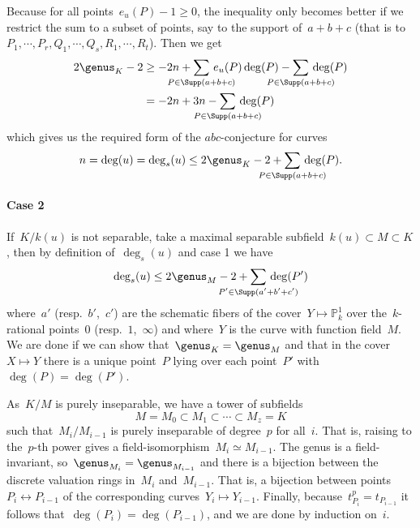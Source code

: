 Because for all points~$e_u(P)-1 \geq 0$, the inequality only becomes better if we restrict the sum to a subset of points, say to the support of~$a+b+c$ (that is to~$P_1,\cdots,P_r,Q_1,\cdots,Q_s,R_1,\cdots,R_t$). Then we get
\begin{equation}
  \begin{aligned}
    2 \genus_K -2 &\geq -2n + \sum_{\mathclap{P \in \Supp(a+b+c)}}\, e_u(P)\deg(P) - \sum_{\mathclap{P \in \Supp(a+b+c)}}\,\deg(P) \\
    &= -2n+3n-\sum_{\mathclap{P \in \Supp(a+b+c)}}\, \deg(P)
  \end{aligned}
\end{equation}
which gives us the required form of the $abc$-conjecture for curves
\begin{equation}
  n=\deg(u)=\deg_s(u) \leq 2\genus_K - 2 + \sum_{\mathclap{P \in \Supp(a+b+c)}}\, \deg(P).
\end{equation}

\paragraph{Case 2} If~$K/k(u)$ is not separable, take a maximal separable subfield~$k(u) \subset M \subset K$, then by definition of~$\deg_s(u)$ and case 1 we have
\begin{equation}
  \deg_s(u) \leq 2\genus_M - 2 + \sum_{\mathclap{P' \in \Supp(a'+b'+c')}}\, \deg(P')
\end{equation}
where~$a'$ (resp.~$b'$,~$c'$) are the schematic fibers of the cover~$Y \mapsto \mathbb{P}^1_k$ over the~$k$-rational points~$0$ (resp.~$1$,~$\infty$) and where~$Y$ is the curve with function field~$M$. We are done if we can show that~$\genus_K=\genus_M$ and that in the cover~$X \mapsto Y$ there is a unique point~$P$ lying over each point~$P'$ with~$\deg(P)=\deg(P')$.

As~$K/M$ is purely inseparable, we have a tower of subfields 
\begin{equation}
  M=M_0 \subset M_1 \subset \cdots \subset M_z=K
\end{equation}
such that~$M_i / M_{i-1}$ is purely inseparable of degree~$p$ for all~$i$. That is, raising to the~$p$-th power gives a field-isomorphism~$M_i \simeq M_{i-1}$. The genus is a field-invariant, so~$\genus_{M_i}=\genus_{M_{i-1}}$ and there is a bijection between the discrete valuation rings in~$M_i$ and~$M_{i-1}$. That is, a bijection between points~$P_i \leftrightarrow P_{i-1}$ of the corresponding curves~$Y_i \mapsto Y_{i-1}$. Finally, because~$t_{P_i}^p = t_{P_{i-1}}$ it follows that~$\deg(P_i)=\deg(P_{i-1})$, and we are done by induction on~$i$.
